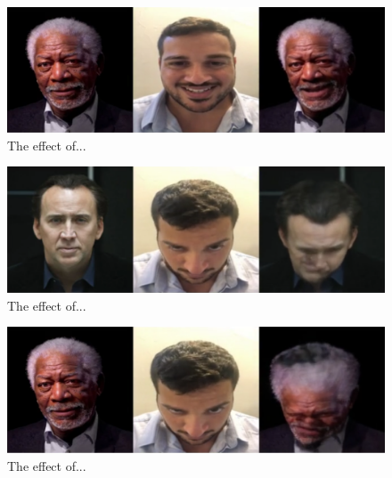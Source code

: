 \documentclass[english,12pt]{article}
\begin{document}
\begin{figure}[htb]
  \begin{centering}
      \includegraphics[scale=0.25]{images/‏‏Amit_smile_freeman.PNG}
  \par\end{centering}
  \caption{\label{fig:Amit_smile_freeman}The effect of...}
\end{figure}

\begin{figure}[htb]
  \begin{centering}
      \includegraphics[scale=0.25]{images/‏‏Amit_tilt1_cage.PNG}
  \par\end{centering}
  \caption{\label{fig:Amit_tilt1_cage}The effect of...}
\end{figure}

\begin{figure}[htb]
  \begin{centering}
      \includegraphics[scale=0.25]{images/‏‏Amit_tilt1_freeman.PNG}
  \par\end{centering}
  \caption{\label{fig:Amit_tilt1_freeman}The effect of...}
\end{figure}
\end{document}
